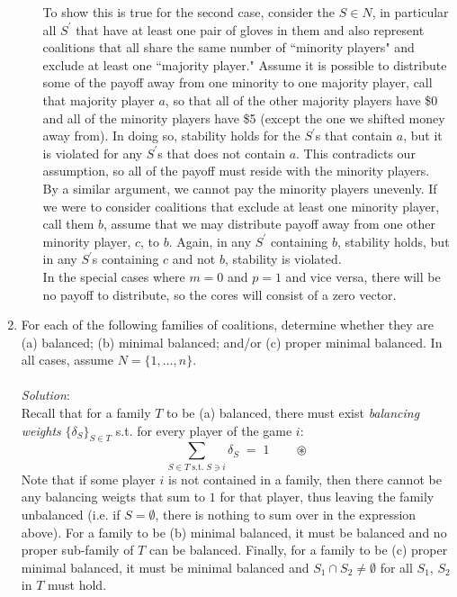 \documentclass{article}
\begin{document}
\begin{enumerate}
\begin{enumerate}
    To show this is true for the second case, consider the $S \in N$, in particular all $S^{\prime}$ that have at least one pair of gloves in them and also represent coalitions that all share the same number of ``minority players" and exclude at least one ``majority player." Assume it is possible to distribute some of the payoff away from one minority to one majority player, call that majority player $a$, so that all of the other majority players have \$0 and all of the minority players have \$5 (except the one we shifted money away from). In doing so, stability holds for the $S^{\prime}$s that contain $a$, but it is violated for any $S^{\prime}$s that does not contain $a$. This contradicts our assumption, so all of the payoff must reside with the minority players. \\

    By a similar argument, we cannot pay the minority players unevenly. If we were to consider coalitions that exclude at least one minority player, call them $b$, assume that we may distribute payoff away from one other minority player, $c$, to $b$. Again, in any $S^{\prime}$ containing $b$, stability holds, but in any $S^{\prime}$s containing $c$ and not $b$, stability is violated. \\

    In the special cases where $m = 0$ and $p = 1$ and vice versa, there will be no payoff to distribute, so the cores will consist of a zero vector. \\

    \end{enumerate}

%
\hfill\newline
\item For each of the following families of coalitions, determine whether they are (a) balanced; (b) minimal balanced; and/or (c) proper minimal balanced. In all cases, assume $N = \{1, \dots, n\}$.\\\\
\textit{Solution}:\\
Recall that for a family $T$ to be (a) balanced, there must exist \emph{balancing weights} $\{\delta_{S}\}_{S \in T}$ s.t. for every player of the game $i$:
    $$\sum_{S \in T \; \text{s.t.} \; S \ni i}{\delta_{S}} \; = \; 1 \qquad \circledast$$
Note that if some player $i$ is not contained in a family, then there cannot be any balancing weigts that sum to $1$ for that player, thus leaving the family unbalanced (i.e. if $S = \emptyset$, there is nothing to sum over in the expression above).
For a family to be (b) minimal balanced, it must be balanced and no proper sub-family of $T$ can be balanced.
Finally, for a family to be (c) proper minimal balanced, it must be minimal balanced and $S_{1} \cap S_{2} \ne \emptyset$ for all $S_{1}$, $S_{2}$ in $T$ must hold.


\end{enumerate}
\end{document}
